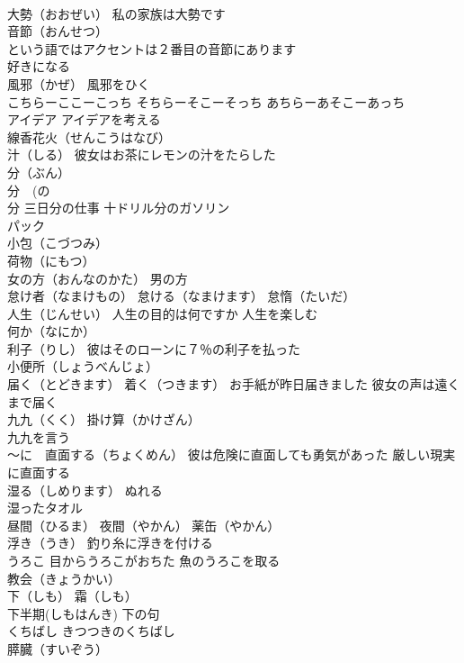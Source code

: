 \documentclass[8pt]{extreport}
\begin{document}
\begin{CJK}{UTF8}{min}
\\	大勢（おおぜい） 私の家族は大勢です
\\	音節（おんせつ） 
\\	という語ではアクセントは２番目の音節にあります
\\	好きになる
\\	風邪（かぜ） 風邪をひく
\\	こちらーここーこっち そちらーそこーそっち あちらーあそこーあっち
\\	アイデア アイデアを考える
\\	線香花火（せんこうはなび）
\\	汁（しる） 彼女はお茶にレモンの汁をたらした
\\	分（ぶん） 
\\	分　(の
\\	分 三日分の仕事 十ドリル分のガソリン
\\	パック 
\\	小包（こづつみ） 
\\	荷物（にもつ） 
\\	女の方（おんなのかた） 男の方
\\	怠け者（なまけもの） 怠ける（なまけます） 怠惰（たいだ）
\\	人生（じんせい） 人生の目的は何ですか 人生を楽しむ
\\	何か（なにか）
\\	利子（りし） 彼はそのローンに７％の利子を払った
\\	小便所（しょうべんじょ）
\\	届く（とどきます） 着く（つきます） お手紙が昨日届きました 彼女の声は遠くまで届く
\\	九九（くく） 掛け算（かけざん）
\\	九九を言う
\\	～に　直面する（ちょくめん） 彼は危険に直面しても勇気があった 厳しい現実に直面する
\\	湿る（しめります） ぬれる 
\\	湿ったタオル
\\	昼間（ひるま） 夜間（やかん） 薬缶（やかん）　
\\	浮き（うき） 釣り糸に浮きを付ける
\\	うろこ 目からうろこがおちた 魚のうろこを取る
\\	教会（きょうかい）
\\	下（しも） 霜（しも）
\\	下半期(しもはんき) 下の句
\\	くちばし きつつきのくちばし
\\	膵臓（すいぞう）

\end{CJK}
\end{document}
